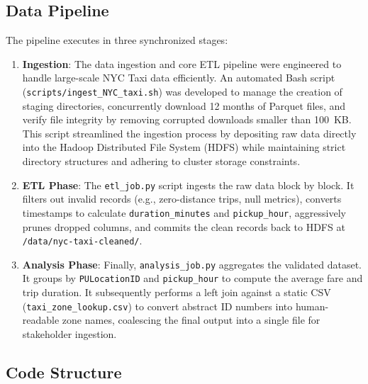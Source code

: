 \subsection{Data Pipeline}
\label{subsec:pipeline}

The pipeline executes in three synchronized stages:
\begin{enumerate}
    \item \textbf{Ingestion}: The data ingestion and core ETL pipeline were engineered to handle large-scale NYC Taxi data efficiently. An automated Bash script (\texttt{scripts/ingest\_NYC\_taxi.sh}) was developed to manage the creation of staging directories, concurrently download 12 months of Parquet files, and verify file integrity by removing corrupted downloads smaller than 100~KB. This script streamlined the ingestion process by depositing raw data directly into the Hadoop Distributed File System (HDFS) while maintaining strict directory structures and adhering to cluster storage constraints.
    
    \item \textbf{ETL Phase}: The \texttt{etl\_job.py} script ingests the raw data block by block. It filters out invalid records (e.g., zero-distance trips, null metrics), converts timestamps to calculate \texttt{duration\_minutes} and \texttt{pickup\_hour}, aggressively prunes dropped columns, and commits the clean records back to HDFS at \texttt{/data/nyc-taxi-cleaned/}.
    \item \textbf{Analysis Phase}: Finally, \texttt{analysis\_job.py} aggregates the validated dataset. It groups by \texttt{PULocationID} and \texttt{pickup\_hour} to compute the average fare and trip duration. It subsequently performs a left join against a static CSV (\texttt{taxi\_zone\_lookup.csv}) to convert abstract ID numbers into human-readable zone names, coalescing the final output into a single file for stakeholder ingestion.
\end{enumerate}

\subsection{Code Structure}
\label{subsec:code-structure}

